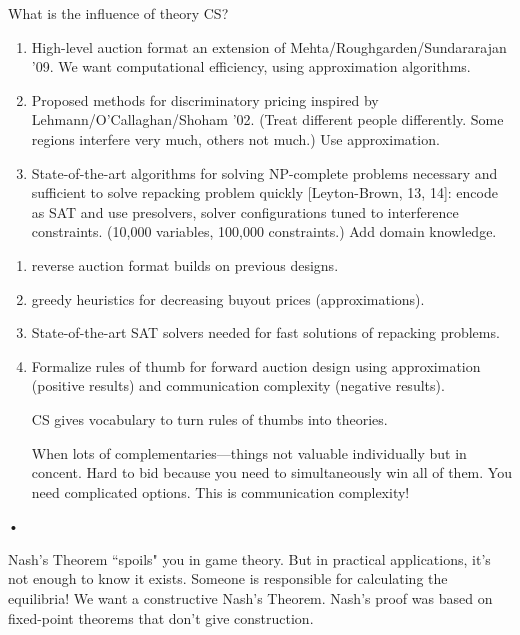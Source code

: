 What is the influence of theory CS?
\begin{enumerate}
\item
High-level auction format an extension of Mehta/Roughgarden/Sundararajan '09.
We want computational efficiency, using approximation algorithms.
\item Proposed methods for discriminatory pricing inspired by Lehmann/O'Callaghan/Shoham '02. (Treat different people differently. Some regions interfere very much, others not much.) Use approximation.
\item
State-of-the-art algorithms for solving NP-complete problems necessary and sufficient to solve repacking problem quickly [Leyton-Brown, 13, 14]: encode as SAT and use presolvers, solver configurations tuned to interference constraints.
(10,000 variables, 100,000 constraints.)
Add domain knowledge.
\end{enumerate}


\begin{enumerate}
\item
reverse auction format builds on previous designs.
\item
greedy heuristics for decreasing buyout prices (approximations).
\item
State-of-the-art SAT solvers needed for fast solutions of repacking problems.
\item
Formalize rules of thumb for forward auction design using approximation (positive results) and communication complexity (negative results).

CS gives vocabulary to turn rules of thumbs into theories.

When lots of complementaries---things not valuable individually but in concent. Hard to bid because you need to simultaneously win all of them. You need complicated options.
This is communication complexity!
\end{enumerate}•

Nash's Theorem ``spoils" you in game theory. But in practical applications, it's not enough to know it exists. Someone is responsible for calculating the equilibria! We want a constructive Nash's Theorem. Nash's proof was based on fixed-point theorems that don't give construction.

